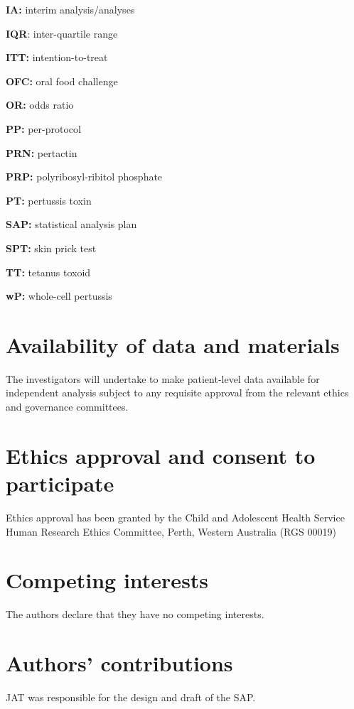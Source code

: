 \documentclass{bmcart}
\begin{document}
\begin{backmatter}
\textbf{IA:} interim analysis/analyses

\textbf{IQR}: inter-quartile range

\textbf{ITT:} intention-to-treat

\textbf{OFC:} oral food challenge

\textbf{OR:} odds ratio

\textbf{PP:} per-protocol

\textbf{PRN:} pertactin

\textbf{PRP:} polyribosyl-ribitol phosphate

\textbf{PT:} pertussis toxin

\textbf{SAP:} statistical analysis plan

\textbf{SPT:} skin prick test

\textbf{TT:} tetanus toxoid

\textbf{wP:} whole-cell pertussis

\section*{Availability of data and materials}%

The investigators will undertake to make patient-level data available for independent analysis subject to any requisite approval from the relevant ethics and governance committees.

\section*{Ethics approval and consent to participate}%

Ethics approval has been granted by the Child and Adolescent Health Service Human Research Ethics Committee, Perth, Western Australia (RGS 00019)

\section*{Competing interests}

The authors declare that they have no competing interests.

\section*{Authors' contributions}

JAT was responsible for the design and draft of the SAP.



\end{backmatter}
\end{document}
